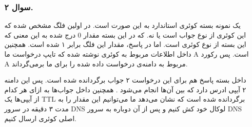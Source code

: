 \pagebreak

\subsubsection*{سوال ۲.}


{
}

یک نمونه بسته کوئری استاندارد به این صورت است. در اولین فلگ مشخص شده که این کوئری از نوع جواب است یا نه. که در این بسته مقدار 0 درج شده به این معنی که این بسته از نوع کوئری است. اما در پاسخ، مقدار این فلگ برابر ۱ شده است. همچنین داخل اطلاعات مربوط به کوئری نوشته شده که تایپ درخواست ما A است. پس رکورد A مربوط به دامنه‌ی درخواست داده شده را برای ما برمی‌گرداند.


{
}

داخل بسته پاسخ هم برای این درخواست ۲ جواب برگردانده شده است. پس این دامنه ۲ آیپی ادرس دارد که بین آن‌ها 
انجام می‌شود
. همچنین داخل جواب‌ها به ازای هر کدام از آیپی‌ها یک TTL برگردانده شده است که نشان می‌دهد ما می‌توانیم این مقدار را به مدت ۳ دقیقه در سرور DNS لوکال خود کش کنیم و پس از آن دوباره به سرور DNS اصلی کوئری ارسال کنیم.


